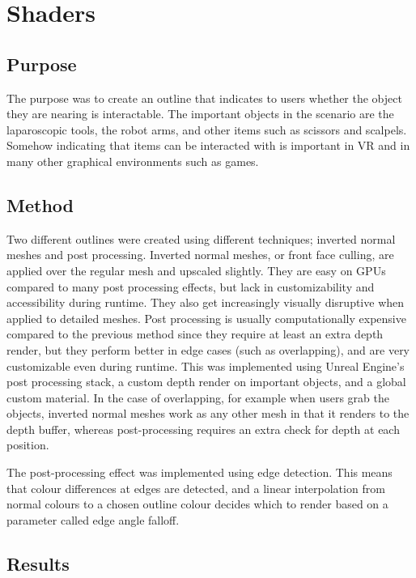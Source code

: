 \chapter*{Shaders}

\section*{Purpose}
The purpose was to create an outline that indicates to users whether the object they are nearing is interactable. The important objects in the scenario are the laparoscopic tools, the robot arms, and other items such as scissors and scalpels. Somehow indicating that items can be interacted with is important in VR and in many other graphical environments such as games.

\section*{Method}
Two different outlines were created using different techniques; inverted normal meshes and post processing. Inverted normal meshes, or front face culling, are applied over the regular mesh and upscaled slightly. They are easy on GPUs compared to many post processing effects, but lack in customizability and accessibility during runtime. They also get increasingly visually disruptive when applied to detailed meshes. Post processing is usually computationally expensive compared to the previous method since they require at least an extra depth render, but they perform better in edge cases (such as overlapping), and are very customizable even during runtime. This was implemented using Unreal Engine's post processing stack, a custom depth render on important objects, and a global custom material. In the case of overlapping, for example when users grab the objects, inverted normal meshes work as any other mesh in that it renders to the depth buffer, whereas post-processing requires an extra check for depth at each position.

The post-processing effect was implemented using edge detection. This means that colour differences at edges are detected, and a linear interpolation from normal colours to a chosen outline colour decides which to render based on a parameter called edge angle falloff.

\section*{Results}

